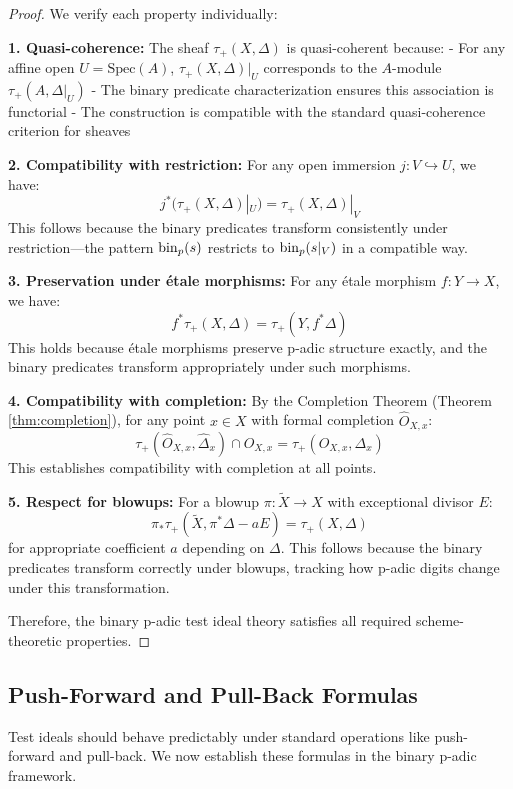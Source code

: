 \begin{proof}
We verify each property individually:

\textbf{1. Quasi-coherence:} 
The sheaf $\tau_+(X,\Delta)$ is quasi-coherent because:
- For any affine open $U = \text{Spec}(A)$, $\tau_+(X,\Delta)|_U$ corresponds to the $A$-module $\tau_+(A,\Delta|_U)$
- The binary predicate characterization ensures this association is functorial
- The construction is compatible with the standard quasi-coherence criterion for sheaves

\textbf{2. Compatibility with restriction:} 
For any open immersion $j: V \hookrightarrow U$, we have:
$$j^*(\tau_+(X,\Delta)|_U) = \tau_+(X,\Delta)|_V$$
This follows because the binary predicates transform consistently under restriction—the pattern $\operatorname{bin}_p(s)$ restricts to $\operatorname{bin}_p(s|_V)$ in a compatible way.

\textbf{3. Preservation under étale morphisms:} 
For any étale morphism $f: Y \to X$, we have:
$$f^*\tau_+(X,\Delta) = \tau_+(Y,f^*\Delta)$$
This holds because étale morphisms preserve p-adic structure exactly, and the binary predicates transform appropriately under such morphisms.

\textbf{4. Compatibility with completion:} 
By the Completion Theorem (Theorem \ref{thm:completion}), for any point $x \in X$ with formal completion $\hat{O}_{X,x}$:
$$\tau_+(\hat{O}_{X,x},\hat{\Delta}_x) \cap O_{X,x} = \tau_+(O_{X,x},\Delta_x)$$
This establishes compatibility with completion at all points.

\textbf{5. Respect for blowups:} 
For a blowup $\pi: \tilde{X} \to X$ with exceptional divisor $E$:
$$\pi_*\tau_+(\tilde{X},\pi^*\Delta - aE) = \tau_+(X,\Delta)$$
for appropriate coefficient $a$ depending on $\Delta$. This follows because the binary predicates transform correctly under blowups, tracking how p-adic digits change under this transformation.

Therefore, the binary p-adic test ideal theory satisfies all required scheme-theoretic properties.
\end{proof}

\subsection{Push-Forward and Pull-Back Formulas}

Test ideals should behave predictably under standard operations like push-forward and pull-back. We now establish these formulas in the binary p-adic framework.

